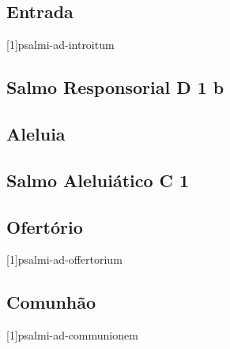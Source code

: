 
\subsection{Entrada}\label{subsection:missae-votivae/missa-votiva-de-mysterio-sanctae-crucis/introitus}
[1]{psalmi-ad-introitum}

\AllowPageFlush

\subsection[Salmo Responsorial]{Salmo Responsorial \textmd{D 1 b}}\label{subsection:missae-votivae/missa-votiva-de-mysterio-sanctae-crucis/psalmus-responsorius}

\AllowPageFlush

\subsection{Aleluia}\label{subsection:missae-votivae/missa-votiva-de-mysterio-sanctae-crucis/alleluia}

\AllowPageFlush

\subsection[Salmo Aleluiático]{Salmo Aleluiático \textmd{C 1}}\label{subsection:missae-votivae/missa-votiva-de-mysterio-sanctae-crucis/psalmus-alleluiaticus}

\AllowPageFlush

\subsection{Ofertório}\label{subsection:missae-votivae/missa-votiva-de-mysterio-sanctae-crucis/offertorium}
[1]{psalmi-ad-offertorium}

\AllowPageFlush

\subsection{Comunhão}\label{subsection:missae-votivae/missa-votiva-de-mysterio-sanctae-crucis/communio}
[1]{psalmi-ad-communionem}